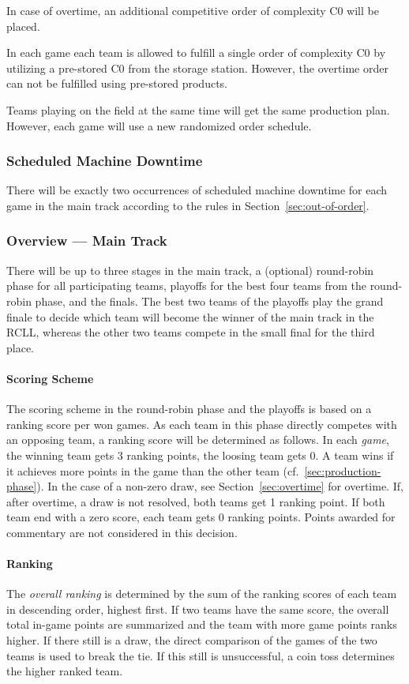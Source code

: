 \documentclass[12pt,twoside]{article}
\newcommand{\refsec}[1]{Section~\ref{#1}}
\begin{document}
In case of overtime, an
additional competitive order of complexity C0 will be placed.

In each game each team is allowed to fulfill a single order of complexity C0 by
utilizing a pre-stored C0 from the storage station.
However, the overtime order can not be fulfilled using pre-stored products.

Teams playing on the field at the same time will get the same
production plan. However, each game will use a new randomized order
schedule.

\subsubsection{Scheduled Machine Downtime}
There will be exactly two occurrences of scheduled machine downtime for each
game in the main track according to the rules in \refsec{sec:out-of-order}.

\subsubsection{Overview --- Main Track}
\label{sec:tournament-phases}
There will be up to three stages in the main track, a (optional) round-robin
phase for all participating teams, playoffs for the best four teams
from the round-robin phase, and the finals. The best two teams of the
playoffs play the grand finale to decide which team will become the
winner of the main track in the \ac{RCLL}, whereas the other two teams compete
in the small final for the third place.

\paragraph{Scoring Scheme}
The scoring scheme in the round-robin phase and the playoffs is based on a
ranking score per won games.
As each team in this phase directly competes with an opposing team, a ranking
score will be determined as follows.
In each \emph{game}, the winning team gets 3 ranking points, the
loosing team gets 0. A team wins if it achieves more points in the game than the
other team (cf.~\ref{sec:production-phase}).
In the case of a non-zero draw, see \refsec{sec:overtime} for overtime.
If, after overtime, a draw is not resolved, both teams get 1 ranking point.
If both team end with a zero score, each team gets 0 ranking points.
Points awarded for commentary are not considered in this decision.

\paragraph{Ranking}
The \emph{overall ranking} is determined by the sum of the ranking scores of
each team in descending order, highest first.
If two teams have the same score, the overall total in-game points are
summarized and the team with more game points ranks higher. If there still is a
draw, the direct comparison of the games of the two teams is used to break the
tie. If this still is unsuccessful, a coin toss determines the higher ranked
team.
\end{document}
